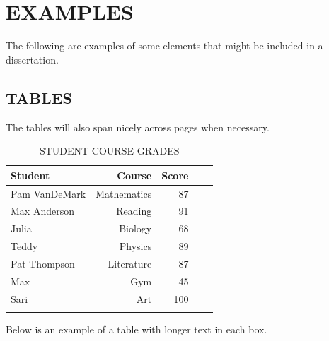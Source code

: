 \documentclass[main.tex]{subfiles}
\begin{document}
\section{EXAMPLES}
    
    The following are examples of some elements that might be included in a dissertation.

    \subsection{TABLES}
        
        The tables will also span nicely across pages when necessary. 
    
        \begin{longtable}{@{}l rr rr}
            
            \toprule%
             \centering%
             {\bfseries Student}
             & {\bfseries Course}
             & {\bfseries Score} \\
            
            \cmidrule[0.4pt](r{0.125em}){1-1}%
            \cmidrule[0.4pt](lr{0.125em}){2-2}%
            \cmidrule[0.4pt](l{0.125em}){3-3}%
            \endhead
            
            Pam VanDeMark & Mathematics & 87 \\
            \myrowcolour%
            Max Anderson & Reading & 91 \\
            Julia & Biology & 68 \\
            \myrowcolour%
            Teddy & Physics & 89 \\ 
            Pat Thompson & Literature & 87 \\ 
            \myrowcolour%
            Max & Gym  & 45 \\ 
            Sari & Art  & 100 \\
            
            \bottomrule
            
            \caption{STUDENT COURSE GRADES}
            \label{tab:grades}
        \end{longtable}
        
        Below is an example of a table with longer text in each box.
    
\end{document}
